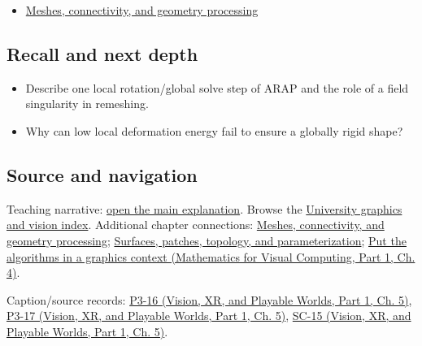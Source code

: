\begin{itemize}
\tightlist
\item
  \hyperref[03-visual-computing-i-ch002-meshes-connectivity-and-geometry-processing]{Meshes, connectivity, and geometry processing}
\end{itemize}

\subsection{Recall and next depth}\label{appendix-7107009c505b-recall-and-next-depth}

\hypertarget{appendix-7107009c505b-recall-and-next-depth}{}

\begin{itemize}
\tightlist
\item
  Describe one local rotation/global solve step of ARAP and the role of a field singularity in remeshing.
\item
  Why can low local deformation energy fail to ensure a globally rigid shape?
\end{itemize}

\subsection{Source and navigation}\label{appendix-7107009c505b-source-and-navigation}

\hypertarget{appendix-7107009c505b-source-and-navigation}{}

Teaching narrative: \hyperref[03-visual-computing-i-ch002-meshes-connectivity-and-geometry-processing]{open the main explanation}. Browse the \hyperref[appendix-a6d556a4ef50-university-graphics-vision-and-photography---independent-series]{University graphics and vision index}. Additional chapter connections: \hyperref[03-visual-computing-i-ch002-meshes-connectivity-and-geometry-processing]{Meshes, connectivity, and geometry processing}; \hyperref[03-visual-computing-i-ch002-surfaces-patches-topology-and-parameterization]{Surfaces, patches, topology, and parameterization}; \href{../02-Mathematics-for-Visual-Computing-P01/main.pdf\#01-foundations-i-ch020-put-the-algorithms-in-a-graphics-context}{Put the algorithms in a graphics context (Mathematics for Visual Computing, Part 1, Ch. 4)}.

Caption/source records: \href{../07-Vision-XR-and-Playable-Worlds-P01/main.pdf\#04-visual-computing-ii-ch036-p3-16---subdivision-surfaces-part-1}{P3-16 (Vision, XR, and Playable Worlds, Part 1, Ch. 5)}, \href{../07-Vision-XR-and-Playable-Worlds-P01/main.pdf\#04-visual-computing-ii-ch036-p3-17---subdivision-surfaces-part-2}{P3-17 (Vision, XR, and Playable Worlds, Part 1, Ch. 5)}, \href{../07-Vision-XR-and-Playable-Worlds-P01/main.pdf\#04-visual-computing-ii-ch036-sc-15---stanford-cs231n-deep-learning-for-computer-vision-spring-2025-lecture-15-3d-vision}{SC-15 (Vision, XR, and Playable Worlds, Part 1, Ch. 5)}.
